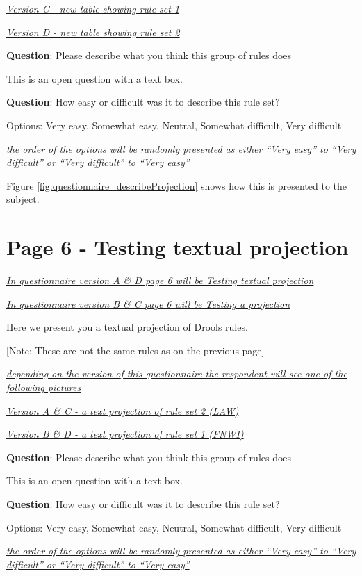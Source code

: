 \emph{\underline{Version C - new table showing rule set 1}}

\emph{\underline{Version D - new table showing rule set 2}}

\textbf{Question}: Please describe what you think this group of rules does

This is an open question with a text box.

\textbf{Question}: How easy or difficult was it to describe this rule set?

Options: Very easy, Somewhat easy, Neutral, Somewhat difficult, Very difficult 

\emph{\underline{the order of the options will be randomly presented as either ``Very easy'' to ``Very difficult'' or ``Very difficult'' to ``Very easy''}}

Figure \ref{fig:questionnaire_describeProjection} shows how this is presented to the subject.

\section*{Page 6 - Testing textual projection}
\emph{\underline{In questionnaire version A \& D page 6 will be Testing textual projection}}

\emph{\underline{In questionnaire version B \& C page 6 will be Testing a projection}}

Here we present you a textual projection of Drools rules.

[Note: These are not the same rules as on the previous page]

\emph{\underline{depending on the version of this questionnaire the respondent will see one of the following pictures}}

\emph{\underline{Version A \& C - a text projection of rule set 2 (LAW)}}

\emph{\underline{Version B \& D - a text projection of rule set 1 (FNWI)}}

\textbf{Question}: Please describe what you think this group of rules does

This is an open question with a text box.

\textbf{Question}: How easy or difficult was it to describe this rule set?

Options: Very easy, Somewhat easy, Neutral, Somewhat difficult, Very difficult 

\emph{\underline{the order of the options will be randomly presented as either ``Very easy'' to ``Very difficult'' or ``Very difficult'' to ``Very easy''}}

